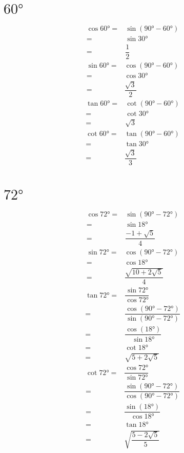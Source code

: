 \section{$\ang{60}$}
\begin{align*}
	\cos\ang{60}=&\sin(\ang{90}-\ang{60})\\
	=&\sin\ang{30}\\
	=&\dfrac{1}{2}
\end{align*}
\begin{align*}
	\sin\ang{60}=&\cos(\ang{90}-\ang{60})\\
	=&\cos\ang{30}\\
	=&\dfrac{\sqrt{3}}{2}
\end{align*}
\begin{align*}
	\tan\ang{60}=&\cot(\ang{90}-\ang{60})\\
	=&\cot\ang{30}\\
	=&\sqrt{3}
\end{align*}
\begin{align*}
	\cot\ang{60}=&\tan(\ang{90}-\ang{60})\\
	=&\tan\ang{30}\\
	=&\dfrac{\sqrt{3}}{3}\\
\end{align*}
\section{$\ang{72}$}
\begin{align*}
	\cos\ang{72}=&\sin(\ang{90}-\ang{72})\\
	=&\sin\ang{18}\\
	=&\dfrac{-1+\sqrt{5}}{4}
\end{align*}
\begin{align*}
	\sin\ang{72}=&\cos(\ang{90}-\ang{72})\\
	=&\cos\ang{18}\\
	=&\dfrac{\sqrt{10+2\sqrt{5}}}{4}
\end{align*}
\begin{align*}
	\tan\ang{72}=&\dfrac{\sin\ang{72}}{\cos\ang{72}}\\
	=&\dfrac{\cos(\ang{90}-\ang{72})}{\sin(\ang{90}-\ang{72})}\\
	=&\dfrac{\cos(\ang{18})}{\sin\ang{18}}\\	
	=&\cot\ang{18}\\
	=&\sqrt{5+2\sqrt{5}}
\end{align*}
\begin{align*}
	\cot\ang{72}=&\dfrac{\cos\ang{72}}{\sin\ang{72}}\\
	=&\dfrac{\sin(\ang{90}-\ang{72})}{\cos(\ang{90}-\ang{72})}\\
	=&\dfrac{\sin(\ang{18})}{\cos\ang{18}}\\	
	=&\tan\ang{18}\\
	=&\sqrt{\dfrac{5-2\sqrt{5}}{5}}
\end{align*}
